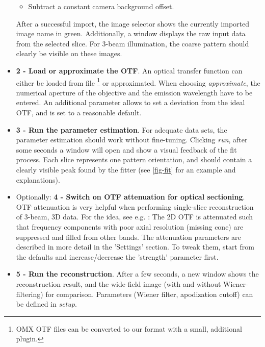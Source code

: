\documentclass[twoside=false,
           twocolumn=false,
           a4paper,DIV=15,
           10pt]{scrartcl}
\begin{document}
\begin{itemize}
\begin{itemize}
\item Subtract a constant camera background offset.
\end{itemize}
After a successful import, the image selector shows the currently
imported image name in green. Additionally, a window displays
the raw input data from the selected slice. For 3-beam illumination,
the coarse pattern should clearly be visible on these images.
\item \textbf{2 - Load or approximate the OTF}. An optical transfer function
can either be loaded from file
\footnote{OMX OTF files can be converted to our format with a 
small, additional plugin.}
or approximated. When choosing
\emph{approximate}, the numerical aperture of the objective and the emission wavelength
have to be entered. An additional parameter allows to set a deviation
from the ideal OTF, and is set to a reasonable default.
\item \textbf{3 - Run the parameter estimation}. 
For adequate data sets, the parameter estimation should work
without fine-tuning. Clicking \emph{run}, after some seconds
a window will open and show a visual feedback of the fit process.
Each slice represents one pattern orientation, and should contain
a clearly visible peak found by the fitter (see \cref{fig-fit} for an example and
explanations).
\item Optionally: \textbf{4 - Switch on OTF attenuation for optical sectioning}.\\
OTF attenuation is very helpful when performing single-slice reconstruction
of 3-beam, 3D data.
For the idea, see e.g. \cite{wicker2013-phase1}: The 2D OTF is attenuated
such that frequency components with poor axial resolution (missing cone)
are suppressed and filled from other bands. The attenuation
parameters are described in more detail in the 'Settings' section.
To tweak them, start from the defaults 
and increase/decrease the 'strength' parameter first.

\item \textbf{5 - Run the reconstruction}. After a few seconds,
a new window shows the reconstruction result, and the wide-field
image (with and without Wiener-filtering) for comparison.
Parameters (Wiener filter, apodization cutoff) can be defined in
\emph{setup}.
\end{itemize}
\end{document}
